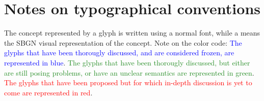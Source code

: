 \section*{Notes on typographical conventions}

The concept represented by a glyph is written using a normal font, while a  means the SBGN visual representation of the concept. Note on the color code: \textcolor{blue}{The glyphs that have been thorougly discussed, and are considered frozen, are represented in blue}. \textcolor{ForestGreen}{The glyphs that have been thorougly discussed, but either are still posing problems, or have an unclear semantics are represented in green}. \textcolor{red}{The glyphs that have been proposed but for which in-depth discussion is yet to come are represented in red}.



